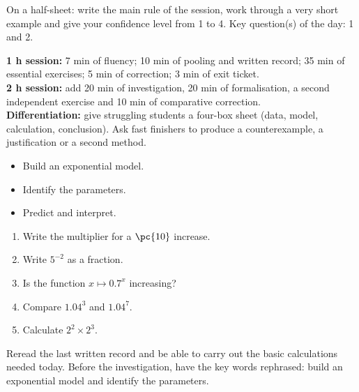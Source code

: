 \begin{exitticket}[3 minutes]On a half-sheet: write the main rule of the session, work through a very short example and give your confidence level from 1 to 4. Key question(s) of the day: 1 and 2.\end{exitticket}

\ifmxteacher
\begin{method}
\textbf{1 h session:} 7 min of fluency; 10 min of pooling and written record; 35 min of essential exercises; 5 min of correction; 3 min of exit ticket.\\
\textbf{2 h session:} add 20 min of investigation, 20 min of formalisation, a second independent exercise and 10 min of comparative correction.\\
\textbf{Differentiation:} give struggling students a four-box sheet (data, model, calculation, conclusion). Ask fast finishers to produce a counterexample, a justification or a second method.
\end{method}
\fi
{}
\begin{objectives}\begin{itemize}\item Build an exponential model.\item Identify the parameters.\item Predict and interpret.\end{itemize}\end{objectives}
\begin{fluency}\begin{enumerate}\item Write the multiplier for a $\pc{10}$ increase. \item Write $5^{-2}$ as a fraction. \item Is the function $x\mapsto\num{0,7}^x$ increasing? \item Compare $\num{1,04}^3$ and $\num{1,04}^7$. \item Calculate $2^2\times2^3$. \end{enumerate}\end{fluency}
\begin{prerequisites}Reread the last written record and be able to carry out the basic calculations needed today. Before the investigation, have the key words rephrased: build an exponential model and identify the parameters.\end{prerequisites}

